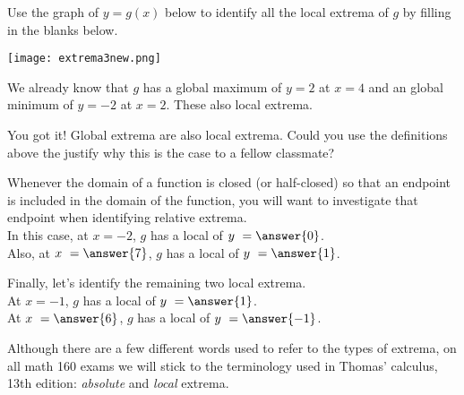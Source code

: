 \documentclass{ximera}
\begin{document}
\begin{exercise}
Use the graph of $y = g(x)$ below to identify all the local extrema of $g$ by filling in the blanks below. 

\begin{center} \texttt{[image: extrema3new.png]} \end{center}

We already know that $g$ has a global maximum of $y = 2$ at $x=4$ and an global minimum of $y=-2$ at $x=2$.  These  also local extrema.  

\begin{feedback}[correct]
You got it!  Global extrema are also local extrema.  Could you use the definitions above the justify why this is the case to a fellow classmate?  
\end{feedback}

\begin{exercise}
Whenever the domain of a function is closed (or half-closed) so that an endpoint is included in the domain of the function, you will want to investigate that endpoint when identifying relative extrema.  \\

In this case, at $x = -2$, $g$ has a local  of $y \ = \answer{0}$.  \\

Also, at $x \ =\answer{7}$, $g$ has a local  of $y \ = \answer{1}$.  \\

\begin{exercise}
Finally, let's identify the remaining two local extrema. \\

At $x = -1$, $g$ has a local  of $y \ = \answer{1}$.  \\

At $x \ = \answer{6}$, $g$ has a local  of $y \ = \answer{-1}$.  \\

\end{exercise}

\end{exercise}


\end{exercise}

\begin{warning}
Although there are a few different words used to refer to the types of extrema, on all math 160 exams we will stick to the terminology used in Thomas' calculus, 13th edition: \textit{absolute} and \textit{local} extrema.  
\end{warning}
\end{document}
